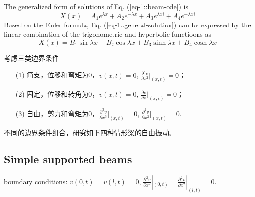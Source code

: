 The generalized form of solutions of Eq. (\ref{eq-1::beam-ode}) is 
\begin{equation}\label{eq-1::general-solution}
    X(x) = A_{1}e^{\lambda x} + A_{2}e^{-\lambda x} + A_{3}e^{\lambda xi} + A_{4}e^{-\lambda xi} 
\end{equation}
Based on the Euler formula, Eq. (\ref{eq-1::general-solution}) can be expressed by the linear combination 
of the trigonometric and hyperbolic functioons as 
\begin{equation}\label{eq-1::general-solution-2}
    X(x) = B_{1}\sin \lambda x + B_{2}\cos \lambda x + B_{3}\sinh \lambda x + B_{4}\cosh \lambda x 
\end{equation}

考虑三类边界条件
\begin{enumerate}
    \item[(1)] 简支，位移和弯矩为0，$v(x,t)=0$, $\frac{\partial^{2} v}{\partial x^{2}}|_{(x,t)}=0$；
    \item[(2)] 固定，位移和转角为0，$v(x,t)=0$, $\frac{\partial v}{\partial x}|_{(x,t)}=0$；
    \item[(3)] 自由，剪力和弯矩为0，$\frac{\partial^{3} v}{\partial x^{3}}|_{(x,t)}=0$, 
                $\frac{\partial^{2} v}{\partial x^{2}}|_{(x,t)}=0$.
\end{enumerate}

不同的边界条件组合，研究如下四种情形梁的自由振动。

\subsection{Simple supported beams}
boundary conditions: $v(0,t)=v(l,t)=0$, 
$\frac{\partial^{2} v}{\partial x^{2}}|_{(0,t)}=\frac{\partial^{2} v}{\partial x^{2}}|_{(l,t)}=0$. 

